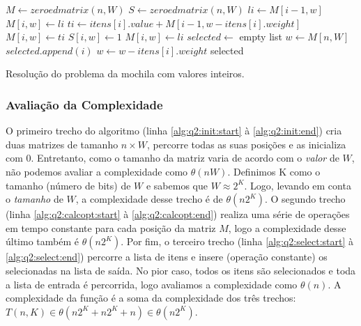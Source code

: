 \documentclass[a4paper, 11pt]{article}
\newcommand{\algsection}[2]{(linha \ref{alg:#1:#2:start} à \ref{alg:#1:#2:end})}
\begin{document}
\begin{algorithm}[htb]
\begin{algorithmic}[1]
    \State {} \label{alg:q2:init:start}
    \State $M \gets zeroed matrix(n, W)$ 
    \State $S \gets zeroed matrix(n, W)$  \label{alg:q2:init:end}
    \State {} \label{alg:q2:calcopt:start}
        \State $li \gets M[i - 1, w]$ 
          \State $M[i, w] \gets li$
        \Else
          \State {}
          \State $ti \gets itens[i].value + M[i- 1, w - itens[i].weight]$
            \State $M[i, w] \gets ti$
            \State $S[i, w] \gets 1$ 
          \Else
            \State $M[i, w] \gets li$
          \EndIf
        \EndIf
      \EndFor
    \EndFor \label{alg:q2:calcopt:end}
    \State {} \label{alg:q2:select:start}
    \State $selected \gets $ empty list
    \State $w \gets M[n, W]$
        \State $selected.append(i)$
        \State $w \gets w - itens[i].weight$
      \EndIf
    \EndFor
    \State \Return selected \label{alg:q2:select:end}
  \EndFunction
\end{algorithmic}
\caption{Resolução do problema da mochila com valores inteiros.}
\label{alg:q2}
\end{algorithm}

\subsubsection{Avaliação da Complexidade}

O primeiro trecho do algoritmo \algsection{q2}{init} cria duas matrizes de tamanho $n \times W$, percorre todas as suas posições e as inicializa com 0. Entretanto, como o tamanho da matriz varia de acordo com o \emph{valor} de $W$, não podemos avaliar a complexidade como $\theta(nW)$. Definimos K como o tamanho (número de bits) de $W$ e sabemos que $W \approx 2^K$. Logo, levando em conta o \emph{tamanho} de $W$, a complexidade desse trecho é de $\theta(n2^K)$. O segundo trecho \algsection{q2}{calcopt} realiza uma série de operações em tempo constante para cada posição da matriz $M$, logo a complexidade desse último também é $\theta(n2^K)$. Por fim, o terceiro trecho \algsection{q2}{select} percorre a lista de itens e insere (operação constante) os selecionadas na lista de saída. No pior caso, todos os itens são selecionados e toda a lista de entrada é percorrida, logo avaliamos a complexidade como $\theta(n)$. A complexidade da função é a soma da complexidade dos três trechos: $T(n, K) \in \theta(n2^K + n2^K + n) \in \theta(n2^K)$.
\end{document}
